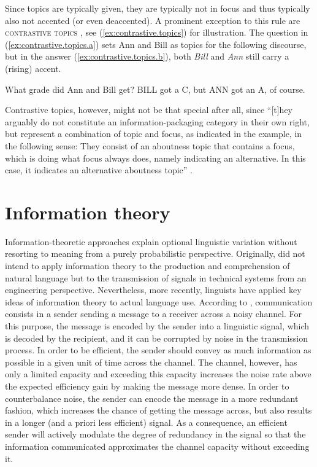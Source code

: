 \documentclass[output=paper,colorlinks,citecolor=brown]{langscibook}
\begin{document}
Since topics are typically given, they are typically not in focus and thus typically also not accented (or even deaccented). A prominent exception to this rule are \textsc{contrastive topics} \citep[e.g.,][]{buring1997}, see (\ref{ex:contrastive.topics}) for illustration. The question in (\ref{ex:contrastive.topics.a}) sets Ann and Bill as topics for the following discourse, but in the answer (\ref{ex:contrastive.topics.b}), both \textit{Bill} and \textit{Ann} still carry a (rising) accent. 

\ea \label{ex:contrastive.topics}
    \ea\label{ex:contrastive.topics.a} 
    What grade did Ann and Bill get?
    \ex\label{ex:contrastive.topics.b} 
    BILL got a C, but ANN got an A, of course.
    \z
\z

Contrastive topics, however, might not be that special after all, since ``[t]hey arguably do not constitute an information-packaging category in their own right, but represent a combination of topic and focus, as indicated in the example, in the following sense: They consist of an aboutness topic that contains a focus, which is doing what focus always does, namely indicating an alternative. In this case, it indicates an alternative aboutness topic'' \citep[44]{krifka2007}.

 

\section{Information theory}\label{sec:information_theory}
Information-theoretic approaches explain optional linguistic variation without resorting to meaning from a purely probabilistic perspective. Originally, \citet{shannon1948} did not intend to apply information theory to the production and comprehension of natural language but to the transmission of signals in technical systems from an engineering perspective. Nevertheless, more recently, linguists have applied key ideas of information theory to actual language use.
According to \citet{shannon1948}, communication consists in a sender sending a message to a receiver across a noisy channel. For this purpose, the message is encoded by the sender into a linguistic signal, which is decoded by the recipient, and it can be corrupted by noise in the transmission process. In order to be efficient, the sender should convey as much information as possible in a given unit of time across the channel. The channel, however, has only a limited capacity and exceeding this capacity increases the noise rate above the expected efficiency gain by making the message more dense. In order to counterbalance noise, the sender can encode the message in a more redundant fashion, which increases the chance of getting the message across, but also results in a longer (and a priori less efficient) signal. As a consequence, an efficient sender will actively modulate the degree of redundancy in the signal so that the information communicated approximates the channel capacity without exceeding it.
\end{document}

